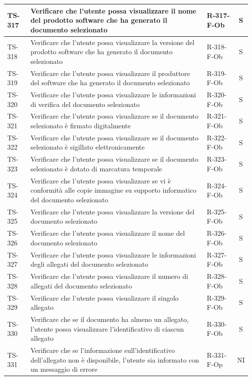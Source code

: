 \documentclass[a4paper,12pt]{article}
\begin{document}
\begin{longtable}{|p{1.5cm}|p{8.3cm}|p{2.4cm}|c|}
\hline
TS-317 & Verificare che l'utente possa visualizzare il nome del prodotto software che ha generato il documento selezionato & R-317-F-Ob & S \\
\hline
TS-318 & Verificare che l'utente possa visualizzare la versione del prodotto software che ha generato il documento selezionato & R-318-F-Ob & S \\
\hline
TS-319 & Verificare che l'utente possa visualizzare il produttore del software che ha generato il documento selezionato & R-319-F-Ob & S \\
\hline
TS-320 & Verificare che l'utente possa visualizzare le informazioni di verifica del documento selezionato & R-320-F-Ob & S \\
\hline
TS-321 & Verificare che l'utente possa visualizzare se il documento selezionato è firmato digitalmente & R-321-F-Ob & S \\
\hline
TS-322 & Verificare che l'utente possa visualizzare se il documento selezionato è sigillato elettronicamente & R-322-F-Ob & S \\
\hline
TS-323 & Verificare che l'utente possa visualizzare se il documento selezionato è dotato di marcatura temporale & R-323-F-Ob & S \\
\hline
TS-324 & Verificare che l'utente possa visualizzare se vi è conformità alle copie immagine su supporto informatico del documento selezionato & R-324-F-Ob & S \\
\hline
TS-325 & Verificare che l'utente possa visualizzare la versione del documento selezionato & R-325-F-Ob & S \\
\hline
TS-326 & Verificare che l'utente possa visualizzare il nome del documento selezionato & R-326-F-Ob & S \\
\hline
TS-327 & Verificare che l'utente possa visualizzare le informazioni degli allegati del documento selezionato & R-327-F-Ob & S \\
\hline
TS-328 & Verificare che l'utente possa visualizzare il numero di allegati del documento selezionato & R-328-F-Ob & S \\
\hline
TS-329 & Verificare che l'utente possa visualizzare il singolo allegato & R-329-F-Ob & S \\
\hline
TS-330 & Verificare che se il documento ha almeno un allegato, l'utente possa visualizzare l'identificativo di ciascun allegato & R-330-F-Ob & S \\
\hline
TS-331 & Verificare che se l'informazione sull'identificativo dell'allegato non è disponibile, l'utente sia informato con un messaggio di errore & R-331-F-Op & NI \\

\end{longtable}
\end{document}
